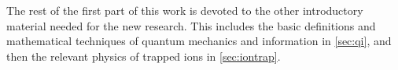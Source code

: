 The rest of the first part of this work is devoted to the other introductory material needed for the new research.
This includes the basic definitions and mathematical techniques of quantum mechanics and information in \cref{sec:qi}, and then the relevant physics of trapped ions in \cref{sec:iontrap}.
